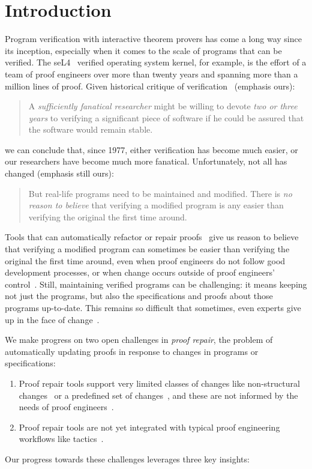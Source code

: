 \section{Introduction}

Program verification with interactive theorem provers has come a long way since its inception,
especially when it comes to the scale of programs that can be verified.
The seL4~\cite{Klein2009} verified operating system kernel, for example,
is the effort of a team of proof engineers over more than twenty years and spanning more than
a million lines of proof.
Given historical critique of verification~\cite{DeMillo1977} (emphasis ours):

\begin{quote}
A \textit{sufficiently fanatical researcher}
might be willing to devote \textit{two or 
three years} to verifying a significant 
piece of software if he could be 
assured that the software would remain stable.
\end{quote}
we can conclude that, since 1977, either verification has become much easier,
or our researchers have become much more fanatical. Unfortunately, not all has changed (emphasis still ours):

\begin{quote}
But real-life programs need to 
be maintained and modified. 
There is \textit{no reason to believe} that verifying a modified program is any 
easier than verifying the original the 
first time around.
\end{quote}
Tools that can automatically refactor or repair proofs~\cite{wibergh2019, WhitesidePhD, Dietrich2013, adams2015, Bourke12, Roe2016, robert2018, pumpkinpatch}
give us reason to believe that verifying a modified program can sometimes be easier than verifying the original the first time
around, even when proof engineers do not follow good development processes,
or when change occurs outside of proof engineers' control~\cite{PGL-045}.
Still, maintaining verified programs can be challenging: it means keeping not just the programs, but also the
specifications and proofs about those programs up-to-date.
This remains so difficult that sometimes, even experts give up in the face of change~\cite{replica}.

We make progress on two open challenges in \textit{proof repair}, the problem of automatically updating proofs in response
to changes in programs or specifications:

\begin{enumerate}
\item Proof repair tools support very limited classes of changes like non-structural changes~\cite{pumpkinpatch} or a predefined set
of changes~\cite{robert2018, wibergh2019}, and these are not informed by the needs of proof engineers~\cite{replica}.
\item Proof repair tools are not yet integrated with typical proof engineering workflows like tactics~\cite{PGL-045, pumpkinpatch, robert2018}.
\end{enumerate}
Our progress towards these challenges leverages three key insights:

